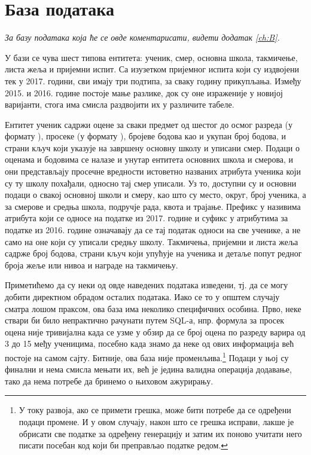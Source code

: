 \section{База података}
\vspace*{-7mm}
\emph{За базу података која ће се овде коментарисати, видети додатак \ref{ch:B}.} %

У бази се чува шест типова ентитета: ученик, смер, основна школа, такмичење, листа жеља и пријемни испит. Са изузетком пријемног испита који су издвојени тек у 2017. години, сви имају три подтипа, за сваку годину прикупљања. Између 2015. и 2016. године постоје мање разлике, док су оне израженије у новијој варијанти, стога има смисла раздвојити их у различите табеле. 

Ентитет ученик садржи оцене за сваки предмет од шестог до осмог разреда (у формату ), просеке (у формату ), бројеве бодова као и укупан број бодова, и страни кључ који указује на завршену основну школу и уписани смер. Подаци о оценама и бодовима се налазе и унутар ентитета основних школа и смерова, и они представљају просечне вредности истоветно названих атрибута ученика који су ту школу похађали, односно тај смер уписали. Уз то, доступни су и основни подаци о свакој основној школи и смеру, као што су место, округ, број ученика, а за смерове и средња школа, подручје рада, квота и трајање. Префикс  у називима атрибута који се односе на податке из 2017. године и суфикс  у атрибутима за податке из 2016. године означавају да се тај податак односи на све ученике, а не само на оне који су уписали средњу школу. Такмичења, пријемни и листа жеља садрже број бодова, страни кључ који упућује на ученика и детаље попут редног броја жеље или нивоа и награде на такмичењу.

Приметићемо да су неки од овде наведених података изведени, тј. да се могу добити директном обрадом осталих података. Иако се то у општем случају сматра лошом праксом, ова база има неколико специфичних особина. Прво, неке ствари би било непрактично рачунати путем SQL-а, нпр. формула за просек оцена није тривијална када се узме у обзир да се број оцена по разреду варира од 3 до 15 међу ученицима, посебно када знамо да неке од ових информација већ постоје на самом сајту. Битније, ова база није променљива.\footnote{У току развоја, ако се примети грешка, може бити потребе да се одређени подаци промене. И у овом случају, након што се грешка исправи, лакше је обрисати све податке за одређену генерацију и затим их поново учитати него писати посебан код који би преправљао податке редом.} Подаци у њој су финални и нема смисла мењати их, већ је једина валидна операција додавање, тако да нема потребе да бринемо о њиховом ажурирању.



